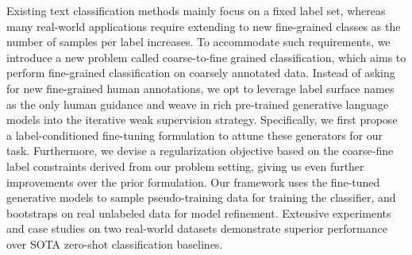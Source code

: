 Existing text classification methods mainly focus on a fixed label set, whereas many real-world applications require extending to new fine-grained classes as the number of samples per label increases. To accommodate such requirements, we introduce a new problem called coarse-to-fine grained classification, which aims to perform fine-grained classification on coarsely annotated data. Instead of asking for new fine-grained human annotations, we opt to leverage label surface names as the only human guidance and weave in rich pre-trained generative language models into the iterative weak supervision strategy. Specifically, we first propose a label-conditioned fine-tuning formulation to attune these generators for our task. Furthermore, we devise a regularization objective based on the coarse-fine label constraints derived from our problem setting, giving us even further improvements over the prior formulation. Our framework uses the fine-tuned generative models to sample pseudo-training data for training the classifier, and bootstraps on real unlabeled data for model refinement. Extensive experiments and case studies on two real-world datasets demonstrate superior performance over SOTA zero-shot classification baselines.

